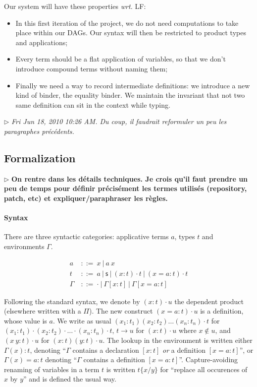\documentclass{article}
\newcommand{\sort}{\textsf{s}}
\newcommand{\gor}{\ |\ }
\newcommand{\gdecl}[2]{{#1}\ &::=\ {#2}}
\newcommand{\subst}[2]{\{#1/#2\}}
\newcommand{\remplan}[1]{\noindent\textcolor{bwblue}{$\triangleright$ \textbf{#1}}}
\newcommand{\remtext}[1]{\textcolor{bwgreen}{$\triangleright$ \textsl{#1}}}
\begin{document}
Our system will have these properties \emph{wrt.} LF:
\begin{itemize}
\item In this first iteration of the project, we do not need
  computations to take place within our DAGs. Our syntax will then be
  restricted to product types and applications;
\item Every term should be a flat application of variables, so that we
  don't introduce compound terms without naming them;
\item Finally we need a way to record intermediate definitions: we
  introduce a new kind of binder, the equality binder. We maintain the
  invariant that not two same definition can sit in the context while
  typing.
\end{itemize}

\remtext{Fri Jun 18, 2010 10:26 AM. 
  Du coup, il faudrait reformuler un peu les paragraphes précédents.}

\subsection{Formalization}

\remplan{On rentre dans les détails techniques. Je crois qu'il faut
  prendre un peu de temps pour définir précisément les termes utilisés
  (repository, patch, etc) et expliquer/paraphraser les règles.}

\paragraph{Syntax} There are three syntactic categories: applicative
terms $a$, types $t$ and environments $\Gamma$.


\begin{align*}
 \gdecl{a}{x \gor a\ x } \\
 \gdecl{t}{a \gor \sort \gor (x:t)\cdot t \gor (x=a:t)\cdot t} \\
 \gdecl{\Gamma}{\cdot \gor \Gamma[x:t] \gor \Gamma[x=a:t]}
\end{align*}

Following the standard syntax, we denote by $(x:t)\cdot u$ the
dependent product (elsewhere written with a $\Pi$). The new construct
$(x=a:t)\cdot u$ is a definition, whose value is $a$. We write as
usual $(x_1:t_1)(x_2:t_2)\ldots(x_n:t_n)\cdot t$ for
$(x_1:t_1)\cdot(x_2:t_2)\cdot\ldots\cdot(x_n:t_n)\cdot t$, $t \to u$
for $(x:t)\cdot u$ where $x\notin u$, and $(x\ y : t)\cdot u$ for
$(x:t)(y:t)\cdot u$. The lookup in the environment is written either
$\Gamma(x):t$, denoting ``$\Gamma$ contains a declaration $[x:t]$
\emph{or} a definition $[x=a:t]$'', or $\Gamma(x)=a:t$ denoting
``$\Gamma$ contains a definition $[x=a:t]$''. Capture-avoiding
renaming of variables in a term $t$ is written $t\subst{x}{y}$ for
``replace all occurences of $x$ by $y$'' and is defined the usual way.
\end{document}
